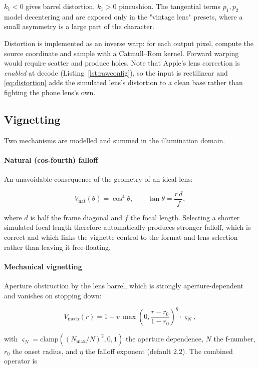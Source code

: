 $k_1 < 0$ gives barrel distortion, $k_1 > 0$ pincushion. The tangential terms
$p_1, p_2$ model decentering and are exposed only in the "vintage lens" presets,
where a small asymmetry is a large part of the character.

Distortion is implemented as an inverse warp: for each output pixel, compute the
source coordinate and sample with a Catmull--Rom kernel. Forward warping would
require scatter and produce holes. Note that Apple's lens correction is
\emph{enabled} at decode (Listing~\ref{lst:rawconfig}), so the input is
rectilinear and \eqref{eq:distortion} adds the simulated lens's distortion to a
clean base rather than fighting the phone lens's own.

\subsection{Vignetting}

Two mechanisms are modelled and summed in the illumination domain.

\paragraph{Natural (cos-fourth) falloff} An unavoidable consequence of the
geometry of an ideal lens:

\begin{equation}
V_{\mathrm{nat}}(\theta) = \cos^4 \theta, \qquad \tan\theta = \frac{r\, d}{f},
\end{equation}

where $d$ is half the frame diagonal and $f$ the focal length. Selecting a
shorter simulated focal length therefore automatically produces stronger
falloff, which is correct and which links the vignette control to the format
and lens selection rather than leaving it free-floating.

\paragraph{Mechanical vignetting} Aperture obstruction by the lens barrel,
which is strongly aperture-dependent and vanishes on stopping down:

\begin{equation}
V_{\mathrm{mech}}(r) = 1 - v\,\max\!\left(0, \frac{r - r_0}{1 - r_0}\right)^{\!\eta} \cdot \varsigma_N,
\end{equation}

with $\varsigma_N = \mathrm{clamp}\!\left((N_{\max}/N)^2, 0, 1\right)$ the
aperture dependence, $N$ the f-number, $r_0$ the onset radius, and $\eta$ the
falloff exponent (default $2.2$). The combined operator is

